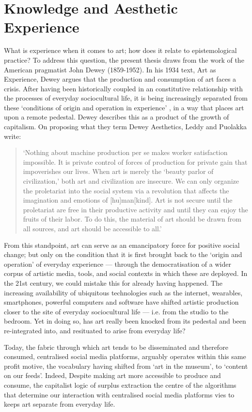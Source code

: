 \section{Knowledge and Aesthetic Experience}\label{sec: theory-experience}
What is experience when it comes to art; how does it relate to epistemological practice? To address this question, the present thesis draws from the work of the American pragmatist John Dewey (1859-1952). In his 1934 text, Art as Experience, Dewey argues that the production and consumption of art faces a crisis. After having been historically coupled in an constitutive relationship with the processes of everyday sociocultural life, it is being increasingly separated from these `conditions of origin and operation in experience' \citep{dewey1934}, in a way that places art upon a remote pedestal. Dewey describes this as a product of the growth of capitalism. On proposing what they term Dewey Aesthetics, Leddy and Puolakka write:
\begin{quote}
    `Nothing about machine production per se makes worker satisfaction impossible. It is private control of forces of production for private gain that impoverishes our lives. When art is merely the `beauty parlor of civilization,' both art and civilization are insecure. We can only organize the proletariat into the social system via a revolution that affects the imagination and emotions of [hu]man[kind]. Art is not secure until the proletariat are free in their productive activity and until they can enjoy the fruits of their labor. To do this, the material of art should be drawn from all sources, and art should be accessible to all.' \citeyearpar{leddy2021}
\end{quote}
From this standpoint, art can serve as an emancipatory force for positive social change; but only on the condition that it is first brought back to the `origin and operation' of everyday experience — through the democratisation of a wider corpus of artistic media, tools, and social contexts in which these are deployed. In the 21st century, we could mistake this for already having happened. The increasing availability of ubiquitous technologies such as the internet, wearables, smartphones, powerful computers and software have shifted artistic production closer to the site of everyday sociocultural life — i.e. from the studio to the bedroom. Yet in doing so, has art really been knocked from its pedestal and been re-integrated into, and resituated to arise from everyday life? 

Today, the fabric through which art tends to be disseminated and therefore consumed, centralised social media platforms, arguably operates within this same profit motive, the vocabulary having shifted from `art in the museum', to `content on our feeds'. Indeed,  Despite making art more accessible to produce and consume, the capitalist logic of surplus extraction the centre of the algorithms that determine our interaction with centralised social media platforms vies to keeps art separate from everyday life.

